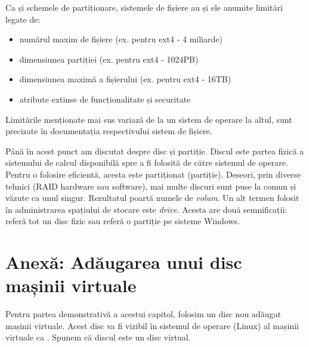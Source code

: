 
Ca și schemele de partiționare, sistemele de fișiere au și ele anumite limitări
legate de:

\begin{itemize}
  \item numărul maxim de fișiere (ex. pentru ext4 - 4 miliarde)
  \item dimensiunea partiției (ex. pentru ext4 - 1024PB)
  \item dimensiunea maximă a fișierului (ex. pentru ext4 - 16TB)
  \item atribute extinse de funcționalitate și securitate
\end{itemize}

Limitările menționate mai sus variază de la un sistem de operare la altul, sunt precizate în documentația respectivului sistem de fișiere.

Până în acest punct am discutat despre disc și partiție. Discul este partea
fizică a sistemului de calcul disponibilă spre a fi folosită de către sistemul
de operare. Pentru o folosire eficientă, acesta este partiționat (partiție).
Deseori, prin diverse tehnici (RAID hardware sau software), mai multe discuri sunt puse la comun și văzute ca unul singur.
Rezultatul poartă numele de \textit{volum}. Un alt termen folosit în
administrarea spațiului de stocare este \textit{drive}. Acesta are două
semnificații: referă tot un disc fizic sau referă o partiție pe sisteme Windows.

\section{Anexă: Adăugarea unui disc mașinii virtuale}
\label{sec:storage:vm-disk}

Pentru partea demonstrativă a acestui capitol, folosim un disc nou adăugat mașinii virtuale.
Acest disc va fi vizibil în sistemul de operare (Linux) al mașinii virtuale ca .
Spunem că discul este un disc virtual.


